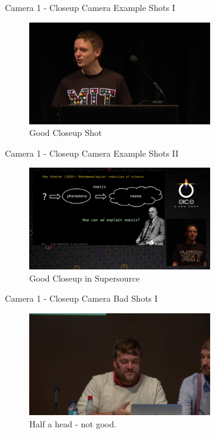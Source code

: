 \documentclass[aspectratio=169]{beamer}
\begin{document}
\begin{frame}{Camera 1 - Closeup Camera}
	Example Shots I
	\begin{figure} 
		\centering
		\includegraphics[width=0.7\textwidth]{closeup1.png}
		\caption{Good Closeup Shot}
		\label{fig:close1}
	\end{figure}
\end{frame}

\begin{frame}{Camera 1 - Closeup Camera}
	Example Shots II
	\begin{figure} 
		\centering
		\includegraphics[width=0.7\textwidth]{closeup2.png}
		\caption{Good Closeup in Supersource}
		\label{fig:close2}
	\end{figure}
\end{frame}

\begin{frame}{Camera 1 - Closeup Camera}
	Bad Shots I
	\begin{figure} 
		\centering
		\includegraphics[width=0.7\textwidth]{closeup-bad1.png}
		\caption{Half a head - not good.}
		\label{fig:closeb1}
	\end{figure}
\end{frame}
\end{document}
